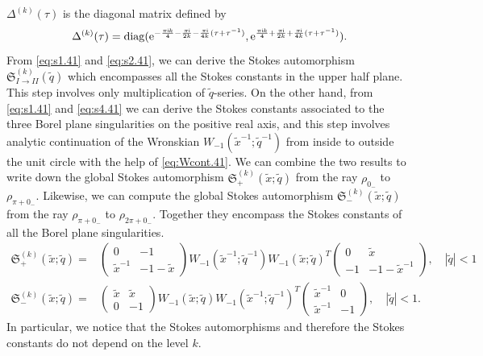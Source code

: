 \documentclass[a4paper,11pt]{article}	%
\DeclareMathOperator{\diag}{diag}
\def\mf{\mathfrak}
\def\tq{\tilde{q}}
\def\tx{\tilde{x}}
\newcommand{\re}{{\rm e}}
\newcommand{\ri}{{\mathsf{i}}}
\begin{document}
$\Delta^{(k)}(\tau)$ is the diagonal matrix defined by
\begin{equation}
  \Delta^{(k)}(\tau) =
  \diag(\re^{-\frac{\pi\ri
      k}{4}-\frac{\pi\ri}{2k}-\frac{\pi\ri}{4k}(\tau+\tau^{-1})},
  \re^{\frac{\pi\ri k}{4}+\frac{\pi\ri}{2k}+\frac{\pi\ri}{4k}(\tau+\tau^{-1})}
  ).
\end{equation}
From \eqref{eq:s1.41} and \eqref{eq:s2.41}, we can derive the Stokes
automorphism $\mf{S}_{I\rightarrow II}^{(k)}(\tq)$ which encompasses all
the Stokes constants in the upper half plane.  This step involves only
multiplication of $\tq$-series.  On the other hand, from
\eqref{eq:s1.41} and \eqref{eq:s4.41} we can derive the Stokes
constants associated to the three Borel plane singularities on the
positive real axis, and this step involves analytic continuation of
the Wronskian $W_{-1}(\tx^{-1};\tq^{-1})$ from inside to outside the
unit circle with the help of \eqref{eq:Wcont.41}.  We can combine the
two results to write down the global Stokes automorphism
$\mf{S}_+^{(k)}(\tx;\tq)$ from the ray $\rho_{0_-}$ to
$\rho_{\pi+0_-}$.  Likewise, we can compute the global Stokes
automorphism $\mf{S}_-^{(k)}(\tx;\tq)$ from the ray $\rho_{\pi+0_-}$
to $\rho_{2\pi+0_-}$.  Together they encompass the Stokes constants of
all the Borel plane singularities.
\begin{align}
  \mf{S}_+^{(k)}(\tx;\tq) =
  &\begin{pmatrix}
    0&-1\\\tx^{-1}&-1-\tx
  \end{pmatrix}W_{-1}(\tx^{-1};\tq^{-1})W_{-1}(\tx;\tq)^T
                    \begin{pmatrix}
                      0&\tx\\-1&-1-\tx^{-1}
                    \end{pmatrix},\quad |\tq|<1\\
  \mf{S}_-^{(k)}(\tx;\tq) =
  &\begin{pmatrix}
    \tx&\tx\\0&-1
  \end{pmatrix}W_{-1}(\tx;\tq) W_{-1}(\tx^{-1};\tq^{-1})^T
                \begin{pmatrix}
                  \tx^{-1}&0\\\tx^{-1}&-1
                \end{pmatrix},\quad |\tq|<1.
\end{align}
In particular, we notice that the Stokes automorphisms and therefore
the Stokes constants do not depend on the level $k$.
\end{document}
